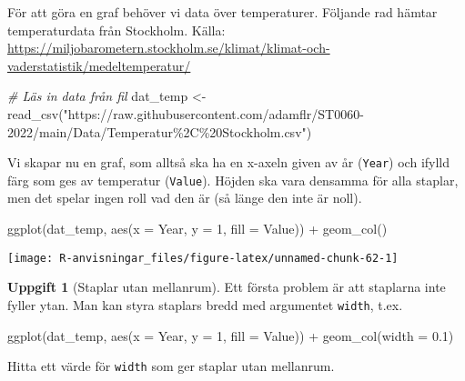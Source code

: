 \documentclass[
]{book}
\newenvironment{Shaded}{\begin{snugshade}}{\end{snugshade}}
\newcommand{\AttributeTok}[1]{\textcolor[rgb]{0.77,0.63,0.00}{#1}}
\newcommand{\CommentTok}[1]{\textcolor[rgb]{0.56,0.35,0.01}{\textit{#1}}}
\newcommand{\DecValTok}[1]{\textcolor[rgb]{0.00,0.00,0.81}{#1}}
\newcommand{\FloatTok}[1]{\textcolor[rgb]{0.00,0.00,0.81}{#1}}
\newcommand{\FunctionTok}[1]{\textcolor[rgb]{0.00,0.00,0.00}{#1}}
\newcommand{\NormalTok}[1]{#1}
\newcommand{\OtherTok}[1]{\textcolor[rgb]{0.56,0.35,0.01}{#1}}
\newcommand{\SpecialCharTok}[1]{\textcolor[rgb]{0.00,0.00,0.00}{#1}}
\newcommand{\StringTok}[1]{\textcolor[rgb]{0.31,0.60,0.02}{#1}}
\theoremstyle{definition}
\theoremstyle{definition}
\theoremstyle{definition}
\newtheorem{exercise}{Uppgift}[chapter]
\theoremstyle{definition}
\theoremstyle{remark}
\begin{document}
För att göra en graf behöver vi data över temperaturer. Följande rad hämtar temperaturdata från Stockholm. Källa: \url{https://miljobarometern.stockholm.se/klimat/klimat-och-vaderstatistik/medeltemperatur/}

\begin{Shaded}
\begin{Highlighting}[]
\CommentTok{\# Läs in data från fil}
\NormalTok{dat\_temp }\OtherTok{\textless{}{-}} \FunctionTok{read\_csv}\NormalTok{(}\StringTok{"https://raw.githubusercontent.com/adamflr/ST0060{-}2022/main/Data/Temperatur\%2C\%20Stockholm.csv"}\NormalTok{)}
\end{Highlighting}
\end{Shaded}

Vi skapar nu en graf, som alltså ska ha en x-axeln given av år (\texttt{Year}) och ifylld färg som ges av temperatur (\texttt{Value}). Höjden ska vara densamma för alla staplar, men det spelar ingen roll vad den är (så länge den inte är noll).

\begin{Shaded}
\begin{Highlighting}[]
\FunctionTok{ggplot}\NormalTok{(dat\_temp, }\FunctionTok{aes}\NormalTok{(}\AttributeTok{x =}\NormalTok{ Year, }\AttributeTok{y =} \DecValTok{1}\NormalTok{, }\AttributeTok{fill =}\NormalTok{ Value)) }\SpecialCharTok{+}
  \FunctionTok{geom\_col}\NormalTok{() }
\end{Highlighting}
\end{Shaded}

\begin{center}\texttt{[image: R-anvisningar\_files/figure-latex/unnamed-chunk-62-1]} \end{center}

\begin{exercise}[Staplar utan mellanrum]
Ett första problem är att staplarna inte fyller ytan. Man kan styra staplars bredd med argumentet \texttt{width}, t.ex.

\begin{Shaded}
\begin{Highlighting}[]
\FunctionTok{ggplot}\NormalTok{(dat\_temp, }\FunctionTok{aes}\NormalTok{(}\AttributeTok{x =}\NormalTok{ Year, }\AttributeTok{y =} \DecValTok{1}\NormalTok{, }\AttributeTok{fill =}\NormalTok{ Value)) }\SpecialCharTok{+}
  \FunctionTok{geom\_col}\NormalTok{(}\AttributeTok{width =} \FloatTok{0.1}\NormalTok{)}
\end{Highlighting}
\end{Shaded}

Hitta ett värde för \texttt{width} som ger staplar utan mellanrum.
\end{exercise}
\end{document}
